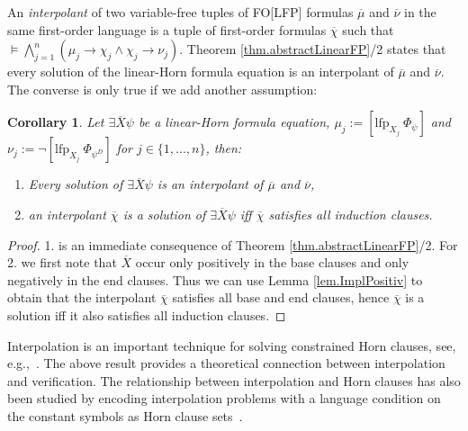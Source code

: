 \documentclass[acmsmall]{acmart}
\theoremstyle{plain}
\newtheorem{corollary}[theorem]{Corollary}
\theoremstyle{definition}
\newcommand{\mybar}[1]{\overline{#1}}
\newcommand{\lfp}{\mathrm{lfp}} %
\begin{document}
An \emph{interpolant} of two variable-free tuples of FO[LFP] formulas $\mybar{\mu}$ and
 $\mybar{\nu}$ in the same first-order language is a tuple of first-order formulas
 $\mybar{\chi}$ such that
 $\models \bigwedge_{j=1}^n (\mu_j \rightarrow \chi_j \land \chi_j \rightarrow \nu_j)$.
Theorem \ref{thm.abstractLinearFP}/2 states that every solution of the linear-Horn formula equation is an interpolant of $\mybar{\mu}$ and $\mybar{\nu}$. The converse is only true if we add another assumption:
\begin{corollary}\label{cor.linHorn_interpol}
	Let $\exists \mybar{X} \psi$ be a linear-Horn formula equation, $\mu_j := [\lfp_{X_j} ~\Phi_\psi]$ and $\nu_j := \neg [\lfp_{X_j} ~\Phi_{\psi^D}]$ for $j \in \{1,...,n\}$, then:
	\begin{enumerate}
		\item Every solution of $\exists \mybar{X} \psi$ is an interpolant of $\mybar{\mu}$ and $\mybar{\nu}$,
		\item an interpolant $\mybar{\chi}$ is a solution of $\exists \mybar{X} \psi$ iff $\mybar{\chi}$ satisfies all induction clauses.
	\end{enumerate}
\end{corollary}
\begin{proof}
	1. is an immediate consequence of Theorem \ref{thm.abstractLinearFP}/2. For 2. we first note that $\mybar{X}$ occur only positively in the base clauses and only negatively in the end clauses. Thus we can use Lemma \ref{lem.ImplPositiv} to obtain that the interpolant $\mybar{\chi}$ satisfies all base and end clauses, hence $\mybar{\chi}$ is a solution iff it also satisfies all induction clauses.
\end{proof}
% 
Interpolation is an important technique for solving constrained Horn clauses, see,
 e.g.,~\cite{McMillan12Solving}.
The above result provides a theoretical connection between interpolation and verification.
The relationship between interpolation and Horn clauses has also been
 studied by encoding interpolation problems with a language condition on the constant
 symbols as Horn clause sets~\cite{Ruemmer13Classifying,Gupta14Generalised}.
\end{document}

